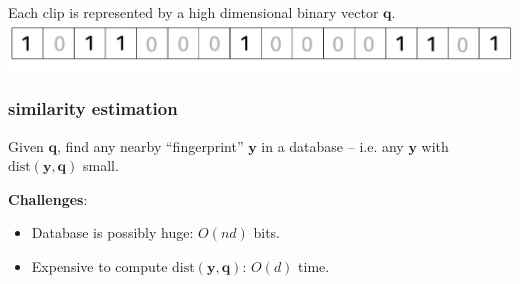\documentclass[compress]{beamer}
\newcommand{\bv}[1]{\mathbf{#1}}
\newcommand{\R}{\mathbb{R}}
\begin{document}
\begin{frame}
		\vspace{-.5em}
			Each clip is represented by a high dimensional binary vector $\bv{q}$.
			\includegraphics[width=\textwidth]{binaryVector.png}
\end{frame}

\begin{frame}
	\frametitle{similarity estimation}
	\begin{center}
		Given $\textbf{q}$, find any nearby ``fingerprint'' $\bv{y}$  in a database -- i.e. any $\bv{y}$ with $\text{dist}(\bv{y}, \bv{q})$ small. 
	\end{center}
	
	\textbf{Challenges}:
	\begin{itemize}
		\item Database is possibly huge: $O(nd)$ bits.
		\item Expensive to compute $\text{dist}(\bv{y},\bv{q})$: $O(d)$ time.
	\end{itemize}
\end{frame}

%	
%
%	
\end{document}
